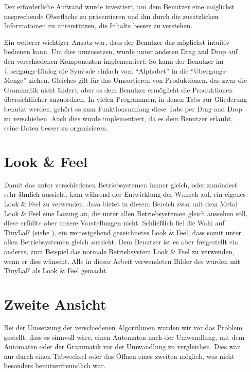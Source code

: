 Der erforderliche Aufwand wurde investiert, um dem Benutzer eine möglichst
ansprechende Oberfläche zu präsentieren und ihn durch die zusätzlichen
Informationen zu unterstützen, die Inhalte besser zu verstehen.\vspace{10pt}

Ein weiterer wichtiger Ansatz war, dass der Benutzer das \gtitool möglichst
intuitiv bedienen kann. Um dies umzusetzen, wurde unter anderen Drag and Drop
auf den verschiedenen Komponenten implementiert. So kann der Benutzer im
Übergangs-Dialog die Symbole einfach vom "`Alphabet"' in die
"`Übergangs-Menge"' ziehen. Gleiches gilt für das Umsortieren von Produktionen,
das zwar die Grammatik nicht ändert, aber es dem Benutzer ermöglicht die
Produktionen übersichtlicher anzuordnen. In vielen Programmen, in denen Tabs
zur Gliederung benutzt werden, gehört es zum Funktionsumfang diese Tabs per Drag
and Drop zu verschieben. Auch dies wurde implementiert, da es dem Benutzer
erlaubt, seine Daten besser zu organisieren.\vspace{10pt}


\section{Look \& Feel}\label{LookAndFeel}

Damit das \gtitool unter verschiedenen Betriebsystemen immer gleich, oder
zumindest sehr ähnlich aussieht, kam während der Entwicklung der Wunsch auf, ein
eigenes Look \& Feel zu verwenden. Java bietet in diesem Bereich zwar mit dem
Metal Look \& Feel eine Lösung an, die unter allen Betriebsystemen gleich
aussehen soll, diese erfüllte aber unsere Vorstellungen nicht. Schließlich fiel
die Wahl auf TinyLaF (siehe \cite{tinylaf}), ein weitestgehend gezeichnetes
Look \& Feel, dass somit unter allen Betriebsystemen gleich aussieht. Dem
Benutzer ist es aber freigestellt ein anderes, zum Beispiel das normale
Betriebsystem Look \& Feel zu verwenden, wenn er dies wünscht. Alle in dieser
Arbeit verwendeten Bilder des \gtitools wurden mit TinyLaF als Look \& Feel
gemacht.\vspace{10pt}


\section{Zweite Ansicht}\label{SecondView}

Bei der Umsetzung der verschiedenen Algorithmen wurden wir vor das Problem
gestellt, dass es sinnvoll wäre, einen Automaten nach der Umwandlung, mit dem
Automaten oder der Grammatik vor der Umwandlung zu vergleichen. Dies war nur
durch einen Tabwechsel oder das Öffnen eines zweiten \gtitools möglich, was
nicht besonders benutzerfreundlich war.\vspace{10pt}

